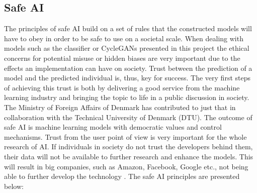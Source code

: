 \documentclass[11pt, fleqn, titlepage]{article}
\newcommand{\1}[1]{\mathds{1}\left[#1\right]}
\begin{document}
\subsection{Safe AI}

The principles of safe AI build on a set of rules that the constructed models will have to obey in order to be safe to use on a societal scale. When dealing with models such as the classifier or CycleGANs presented in this project the ethical concerns for potential misuse or hidden biases are very important due to the effects an implementation can have on society. Trust between the prediction of a model and the predicted individual is, thus, key for success. The very first steps of achieving this trust is both by delivering a good service from the machine learning industry and bringing the topic to life in a public discussion in society. The Ministry of Foreign Affairs of Denmark has contributed to just that in collaboration with the Technical University of Denmark (DTU). The outcome of safe AI is machine learning models with democratic values and control mechanisms. Trust from the user point of view is very important for the whole research of AI. If individuals in society do not trust the developers behind them, their data will not be available to further research and enhance the models. This will result in big companies, such as Amazon, Facebook, Google etc., not being able to further develop the technology \cite{larsk}. The safe AI principles are presented below:
\end{document}
